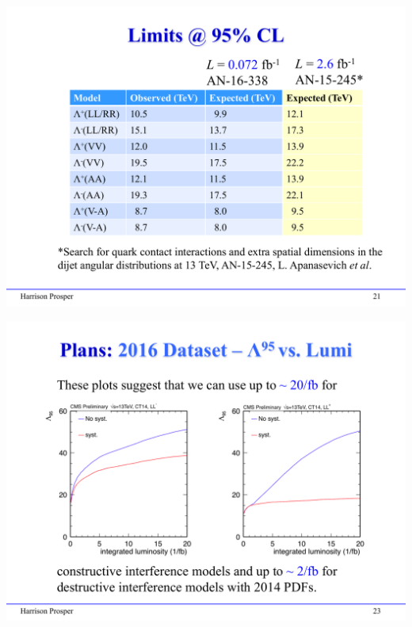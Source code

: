 \documentclass[t,professionalfonts,handout, xcolor=pdftex,dvipsnames,table]{beamer}
\begin{document}
\begin{frame}
\centerline{
\includegraphics[width=\textwidth]{fig_results.pdf}
}
\end{frame}


\begin{frame}
\centerline{
\includegraphics[width=\textwidth]{fig_projections.pdf}
}
\end{frame}
\end{document}
